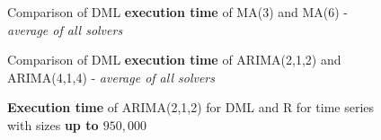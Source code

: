 \begin{figure}[ht]
	\centering
	\caption{Comparison of DML \textbf{execution time} of MA(3) and MA(6) - \textit{average of all solvers}}
    \label{apx-fig:ma-comparison}
\end{figure}


\begin{figure}[ht]
	\centering
	\caption{Comparison of DML \textbf{execution time} of ARIMA(2,1,2) and ARIMA(4,1,4) - \textit{average of all solvers}}
    \label{apx-fig:arima-comparison}
\end{figure}


\begin{figure}[ht]
	\centering
	\caption{\textbf{Execution time} of ARIMA(2,1,2) for DML and R for time series with sizes \textbf{up to $950,000$} }
    \label{apx-fig:arima212-exectime-scatter-all}
\end{figure}

